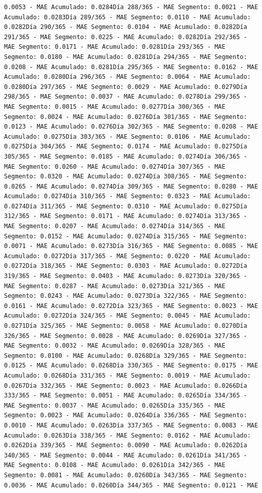 \documentclass[
]{book}
\begin{document}
\begin{verbatim}
0.0053 - MAE Acumulado: 0.0284Día 288/365 - MAE Segmento: 0.0021 - MAE Acumulado: 0.0283Día 289/365 - MAE Segmento: 0.0110 - MAE Acumulado: 0.0282Día 290/365 - MAE Segmento: 0.0104 - MAE Acumulado: 0.0282Día 291/365 - MAE Segmento: 0.0225 - MAE Acumulado: 0.0282Día 292/365 - MAE Segmento: 0.0171 - MAE Acumulado: 0.0281Día 293/365 - MAE Segmento: 0.0180 - MAE Acumulado: 0.0281Día 294/365 - MAE Segmento: 0.0208 - MAE Acumulado: 0.0281Día 295/365 - MAE Segmento: 0.0162 - MAE Acumulado: 0.0280Día 296/365 - MAE Segmento: 0.0064 - MAE Acumulado: 0.0280Día 297/365 - MAE Segmento: 0.0029 - MAE Acumulado: 0.0279Día 298/365 - MAE Segmento: 0.0037 - MAE Acumulado: 0.0278Día 299/365 - MAE Segmento: 0.0015 - MAE Acumulado: 0.0277Día 300/365 - MAE Segmento: 0.0024 - MAE Acumulado: 0.0276Día 301/365 - MAE Segmento: 0.0123 - MAE Acumulado: 0.0276Día 302/365 - MAE Segmento: 0.0208 - MAE Acumulado: 0.0275Día 303/365 - MAE Segmento: 0.0106 - MAE Acumulado: 0.0275Día 304/365 - MAE Segmento: 0.0174 - MAE Acumulado: 0.0275Día 305/365 - MAE Segmento: 0.0185 - MAE Acumulado: 0.0274Día 306/365 - MAE Segmento: 0.0260 - MAE Acumulado: 0.0274Día 307/365 - MAE Segmento: 0.0320 - MAE Acumulado: 0.0274Día 308/365 - MAE Segmento: 0.0265 - MAE Acumulado: 0.0274Día 309/365 - MAE Segmento: 0.0280 - MAE Acumulado: 0.0274Día 310/365 - MAE Segmento: 0.0323 - MAE Acumulado: 0.0274Día 311/365 - MAE Segmento: 0.0310 - MAE Acumulado: 0.0275Día 312/365 - MAE Segmento: 0.0171 - MAE Acumulado: 0.0274Día 313/365 - MAE Segmento: 0.0207 - MAE Acumulado: 0.0274Día 314/365 - MAE Segmento: 0.0152 - MAE Acumulado: 0.0274Día 315/365 - MAE Segmento: 0.0071 - MAE Acumulado: 0.0273Día 316/365 - MAE Segmento: 0.0085 - MAE Acumulado: 0.0272Día 317/365 - MAE Segmento: 0.0220 - MAE Acumulado: 0.0272Día 318/365 - MAE Segmento: 0.0303 - MAE Acumulado: 0.0272Día 319/365 - MAE Segmento: 0.0403 - MAE Acumulado: 0.0273Día 320/365 - MAE Segmento: 0.0287 - MAE Acumulado: 0.0273Día 321/365 - MAE Segmento: 0.0243 - MAE Acumulado: 0.0273Día 322/365 - MAE Segmento: 0.0161 - MAE Acumulado: 0.0272Día 323/365 - MAE Segmento: 0.0023 - MAE Acumulado: 0.0272Día 324/365 - MAE Segmento: 0.0045 - MAE Acumulado: 0.0271Día 325/365 - MAE Segmento: 0.0058 - MAE Acumulado: 0.0270Día 326/365 - MAE Segmento: 0.0028 - MAE Acumulado: 0.0269Día 327/365 - MAE Segmento: 0.0032 - MAE Acumulado: 0.0269Día 328/365 - MAE Segmento: 0.0100 - MAE Acumulado: 0.0268Día 329/365 - MAE Segmento: 0.0125 - MAE Acumulado: 0.0268Día 330/365 - MAE Segmento: 0.0175 - MAE Acumulado: 0.0268Día 331/365 - MAE Segmento: 0.0019 - MAE Acumulado: 0.0267Día 332/365 - MAE Segmento: 0.0023 - MAE Acumulado: 0.0266Día 333/365 - MAE Segmento: 0.0051 - MAE Acumulado: 0.0265Día 334/365 - MAE Segmento: 0.0037 - MAE Acumulado: 0.0265Día 335/365 - MAE Segmento: 0.0023 - MAE Acumulado: 0.0264Día 336/365 - MAE Segmento: 0.0010 - MAE Acumulado: 0.0263Día 337/365 - MAE Segmento: 0.0083 - MAE Acumulado: 0.0263Día 338/365 - MAE Segmento: 0.0162 - MAE Acumulado: 0.0262Día 339/365 - MAE Segmento: 0.0090 - MAE Acumulado: 0.0262Día 340/365 - MAE Segmento: 0.0044 - MAE Acumulado: 0.0261Día 341/365 - MAE Segmento: 0.0108 - MAE Acumulado: 0.0261Día 342/365 - MAE Segmento: 0.0081 - MAE Acumulado: 0.0260Día 343/365 - MAE Segmento: 0.0036 - MAE Acumulado: 0.0260Día 344/365 - MAE Segmento: 0.0121 - MAE 
\end{verbatim}
\end{document}
